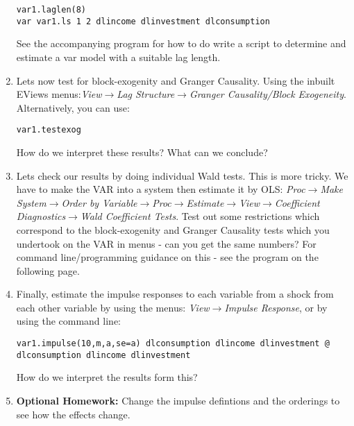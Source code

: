\documentclass[a4paper,10pt]{article}
\begin{document}
\begin{enumerate}
\begin{center}
\texttt{var1.laglen(8)\\
var var1.ls 1 2 dlincome dlinvestment dlconsumption}
\end{center}
See the accompanying program for how to do write a script to determine and estimate a var model with a suitable lag length.
\item Lets now test for block-exogenity and Granger Causality. Using the inbuilt EViews menus:\emph{View}$\rightarrow$\emph{Lag Structure}$\rightarrow$\emph{Granger Causality/Block Exogeneity}. Alternatively, you can use:
\begin{center}
\texttt{var1.testexog}
\end{center}
How do we interpret these results? What can we conclude?
\item Lets check our results by doing individual Wald tests. This is more tricky. We have to make the VAR into a system then estimate it by OLS: \emph{Proc}$\rightarrow$\emph{Make System}$\rightarrow$\emph{Order by Variable}$\rightarrow$\emph{Proc}$\rightarrow$\emph{Estimate}$\rightarrow$\emph{View}$\rightarrow$\emph{Coefficient Diagnostics}$\rightarrow$\emph{Wald Coefficient Tests}. Test out some restrictions which correspond to the block-exogenity and Granger Causality tests which you undertook on the VAR in menus - can you get the same numbers? For command line/programming guidance on this - see the program on the following page.
\item Finally, estimate the impulse responses to each variable from a shock from each other variable by using the menus: \emph{View}$\rightarrow$\emph{Impulse Response}, or by using the command line:
\begin{center}
\texttt{var1.impulse(10,m,a,se=a) dlconsumption dlincome dlinvestment @ dlconsumption dlincome dlinvestment}
\end{center}
How do we interpret the results form this?\\
\item \textbf{Optional Homework:} Change the impulse defintions and the orderings to see how the effects change.
\end{enumerate}
\newpage
\end{document}
